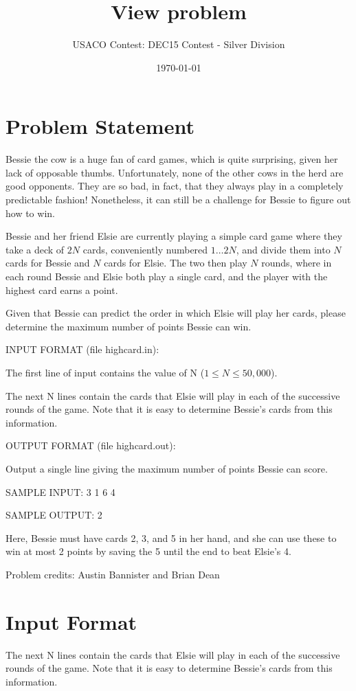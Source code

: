 \documentclass[12pt]{article}
\title{View problem}
\author{USACO Contest: DEC15 Contest - Silver Division}
\date{\today}
\begin{document}
\maketitle

\section*{Problem Statement}

Bessie the cow is a huge fan of card games, which is quite surprising, given her
lack of opposable thumbs.  Unfortunately, none of the other cows in the herd are
good opponents.  They are so bad, in fact, that they always play in a completely
predictable fashion!  Nonetheless, it can still be a challenge for Bessie to
figure out how to win.

Bessie and her friend Elsie are currently playing a simple card game where they
take a deck of $2N$ cards, conveniently numbered $1 \ldots 2N$, and divide them
into $N$ cards for Bessie and $N$ cards for Elsie. The two then play $N$
rounds, where in each round Bessie and Elsie both play a single card, and the
player with the highest card earns a point.

Given that Bessie can predict the order in which Elsie will play her cards,
please determine the maximum number of points Bessie can win.

INPUT FORMAT (file highcard.in):

The first line of input contains the value of N ($1 \leq N \leq 50,000$).

The next N lines contain the cards that Elsie will play in each of the
successive rounds of the game.  Note that it is easy to determine Bessie's cards
from this information.


OUTPUT FORMAT (file highcard.out):

Output a single line giving the maximum number of points Bessie can score.


SAMPLE INPUT:
3
1
6
4

SAMPLE OUTPUT: 
2

Here, Bessie must have cards 2, 3, and 5 in her hand, and she can use these to
win at most 2 points by saving the 5 until the end to beat Elsie's 4.

Problem credits: Austin Bannister and Brian Dean



\section*{Input Format}
The next N lines contain the cards that Elsie will play in each of the
successive rounds of the game.  Note that it is easy to determine Bessie's cards
from this information.
\end{document}
